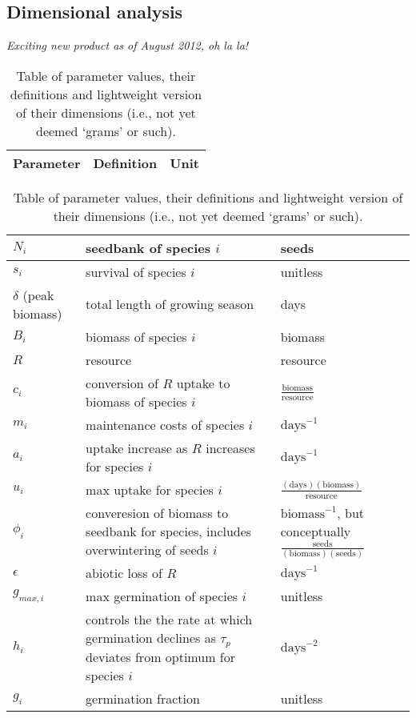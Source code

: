 \documentclass[11pt,a4paper,oneside]{article}
\begin{document}
\newpage 
\subsection{Dimensional analysis}
\noindent \emph{Exciting new product as of August 2012, oh la la!}
\begin{center}
\begin{table}[h!]
\caption{Table of parameter values, their definitions and lightweight version of their dimensions (i.e., not yet deemed `grams' or such).}
\begin{tabular}{ | p{3.0cm} | p{6.0cm} | p{4.0cm} |}
\hline 
Parameter & Definition & Unit \\ \hline 
\end{tabular}
\begin{tabular}{ | p{3.0cm} | p{6.0cm} | p{4.0cm} |}
\(N_{i}\) & seedbank of species \(i\) & seeds \\ \hline
\(s_{i}\) & survival of species \(i\) & unitless \\ \hline
\(\delta\) (peak biomass) & total length of growing season & days\\ \hline
\(B_{i}\) & biomass of species \(i\) & biomass \\ \hline
\(R\) & resource & resource\\ \hline
\(c_{i}\) & conversion of \(R\) uptake to biomass of species \(i\) &  \(\frac{\text{biomass}}{\text{resource}}\) \\ \hline
\(m_{i}\) & maintenance costs of species \(i\) & \(\text{days}^{-1}\) \\ \hline
\(a_{i}\) & uptake increase as \(R\) increases for species \(i\) & \(\text{days}^{-1}\) \\ \hline
\(u_{i}\) & max uptake for species \(i\) & \(\frac{(\text{days})(\text{biomass})}{\text{resource}}\) \\ \hline
\(\phi_{i}\) & converesion of biomass to seedbank for species, includes overwintering of seeds \(i\) & \(\text{biomass}^{-1}\), but conceptually \(\frac{\text{seeds}}{(\text{biomass})(\text{seeds})}\) \\ \hline
\(\epsilon\) & abiotic loss of \(R\) &  \(\text{days}^{-1}\) \\ \hline
\(g_{max,i}\) & max germination of species \(i\) & unitless \\ \hline
\(h_{i}\) &  controls the the rate at which germination declines as \(\tau_{p}\) deviates from optimum for species \(i\)  & \(\text{days}^{-2}\) \\ \hline
\(g_{i}\) & germination fraction & unitless \\ \hline

\end{tabular}
\end{table}
\end{center}
\end{document}
